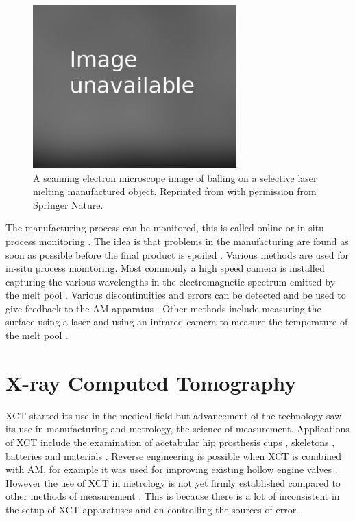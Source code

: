 \begin{figure}
  \centering
  \includegraphics[width=0.7\textwidth]{../figures/literatureReview/literature_balling.png}
  \caption{A scanning electron microscope image of balling on a selective laser melting manufactured object. Reprinted from \cite{li2012balling} with permission from Springer Nature.}
  \label{fig:literature_balling}
\end{figure}

The manufacturing process can be monitored, this is called online or in-situ process monitoring \citep{everton2016review}. The idea is that problems in the manufacturing are found as soon as possible before the final product is spoiled \citep{cerniglia2015inspection}. Various methods are used for in-situ process monitoring. Most commonly a high speed camera is installed capturing the various wavelengths in the electromagnetic spectrum emitted by the melt pool \citep{berumen2010quality, craeghs2011online, lott2011design}. Various discontinuities and errors can be detected \citep{clijsters2014in} and be used to give feedback to the AM apparatus \citep{herzog2013method}. Other methods include measuring the surface using a laser \citep{cerniglia2015inspection} and using an infrared camera to measure the temperature of the melt pool \citep{rodriguez2012integration}. 

\section{X-ray Computed Tomography}

XCT started its use in the medical field but advancement of the technology saw its use in manufacturing and metrology, the science of measurement. Applications of XCT include the examination of acetabular hip prosthesis cups \citep{kourra2018computed}, skeletons \citep{appleby2014scoliosis}, batteries \citep{taiwo2017investigating} and materials \citep{zhang2016x, wang2017x}. Reverse engineering is possible when XCT is combined with AM, for example it was used for improving existing hollow engine valves \citep{cooper2015design}. However the use of XCT in metrology is not yet firmly established compared to other methods of measurement \citep{thompson2016x}. This is because there is a lot of inconsistent in the setup of XCT apparatuses and on controlling the sources of error.

